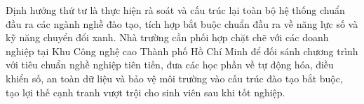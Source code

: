 Định hướng thứ tư là thực hiện rà soát và cấu trúc lại toàn bộ hệ thống chuẩn đầu ra các ngành nghề đào tạo, tích hợp bắt buộc chuẩn đầu ra về năng lực số và kỹ năng chuyển đổi xanh. Nhà trường cần phối hợp chặt chẽ với các doanh nghiệp tại Khu Công nghệ cao Thành phố Hồ Chí Minh để đối sánh chương trình với tiêu chuẩn nghề nghiệp tiên tiến, đưa các học phần về tự động hóa, điều khiển số, an toàn dữ liệu và bảo vệ môi trường vào cấu trúc đào tạo bắt buộc, tạo lợi thế cạnh tranh vượt trội cho sinh viên sau khi tốt nghiệp.
